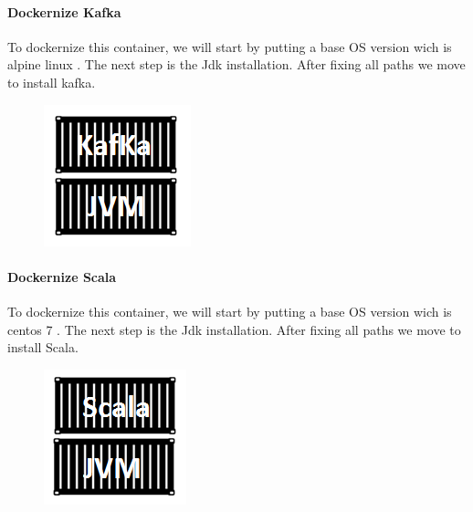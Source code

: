 \paragraph{Dockernize Kafka}
\label{sec:sec01}
To dockernize this container, we will start by putting a base OS version wich is alpine linux . The next step is the Jdk installation. After fixing all paths we move to install
kafka.
\begin{figure}[h!]
	\centering
	\includegraphics[height=0.2\textheight]{fig01/KafkaContainer}
	\label{fig:FilialesEtClients}
\end{figure}
\paragraph{Dockernize Scala}
\label{sec:sec01}
To dockernize this container, we will start by putting a base OS version wich is centos 7 . 
The next step is the Jdk installation. After fixing all paths we move to install Scala.
\begin{figure}[h!]
	\centering
	\includegraphics[height=0.2\textheight]{fig01/ScalaContainer}
	\label{fig:FilialesEtClients}
\end{figure}
